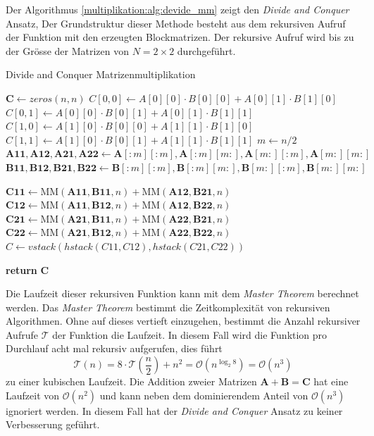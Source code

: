 Der Algorithmus \ref{multiplikation:alg:devide_mm} zeigt den \textit{Divide and Conquer} Ansatz,
Der Grundstruktur dieser Methode besteht aus dem rekursiven Aufruf der Funktion mit den erzeugten Blockmatrizen.
Der rekursive Aufruf wird bis zu der Gr\"osse der Matrizen von $N = 2 \times 2$ durchgef\"uhrt.
\begin{algorithm}\footnotesize\caption{Divide and Conquer Matrizenmultiplikation}
	\setlength{\lineskip}{7pt}
	\label{multiplikation:alg:devide_mm}
	\begin{algorithmic}
		\State  $ \mathbf{C} \gets zeros(n, n)$
		\State  $C[0, 0] \gets  A[0][0]\cdot B[0][0]+A[0][1]\cdot B[1][0]$
		\State  $C[0, 1] \gets  A[0][0]\cdot B[0][1]+A[0][1]\cdot B[1][1]$
		\State  $C[1, 0] \gets  A[1][0]\cdot B[0][0]+A[1][1]\cdot B[1][0]$
		\State  $C[1, 1] \gets  A[1][0]\cdot B[0][1]+A[1][1]\cdot B[1][1]$
		\Else
		\State  $ m \gets n/2$
		\State $\mathbf{A11}, \mathbf{A12}, \mathbf{A21}, \mathbf{A22} \gets \mathbf{A}[:m][:m], \mathbf{A}[:m][m:], \mathbf{A}[m:][:m], \mathbf{A}[m:][m:]$
		\State $\mathbf{B11}, \mathbf{B12}, \mathbf{B21}, \mathbf{B22} \gets \mathbf{B}[:m][:m], \mathbf{B}[:m][m:], \mathbf{B}[m:][:m], \mathbf{B}[m:][m:]$

		\State $\mathbf{C11} \gets \text{MM}(\mathbf{A11}, \mathbf{B11},n) + \text{MM}(\mathbf{A12}, \mathbf{B21},n)$
		\State $\mathbf{C12} \gets \text{MM}(\mathbf{A11},\mathbf{B12},n) + \text{MM}(\mathbf{A12}, \mathbf{B22},n)$
		\State $\mathbf{C21} \gets \text{MM}(\mathbf{A21}, \mathbf{B11},n) + \text{MM}(\mathbf{A22}, \mathbf{B21},n)$
		\State $\mathbf{C22} \gets \text{MM}(\mathbf{A21}, \mathbf{B12},n) + \text{MM}(\mathbf{A22}, \mathbf{B22},n)$
		\State $  C \gets vstack(hstack(C11, C12), hstack(C21, C22))$

		\EndIf
		\State \textbf{return} $\textbf{C}$

		\EndFunction
	\end{algorithmic}
\end{algorithm}

Die Laufzeit dieser rekursiven Funktion kann mit dem \textit{Master Theorem} \cite{multiplikation:master_theorem} berechnet werden. Das \textit{Master Theorem} bestimmt die Zeitkomplexit\"at von rekursiven Algorithmen.
Ohne auf dieses vertieft einzugehen, bestimmt die Anzahl rekursiver Aufrufe $\mathcal{T} $ der Funktion die Laufzeit.
In diesem Fall wird die Funktion pro Durchlauf acht mal rekursiv aufgerufen, dies f\"uhrt
\begin{equation} \label{multiplikation:eq:laufzeitdac}
	\mathcal{T}(n) =	8 \cdot \mathcal{T} \left(\frac{n}{2}\right ) + n^2  = \mathcal{O}(n^{\log_2 8}) = \mathcal{O}  (n^{3} )
\end{equation}
zu einer kubischen Laufzeit.
Die Addition zweier Matrizen $\mathbf{A} + \mathbf{B} = \mathbf{C}$ hat eine Laufzeit von $\mathcal{O}(n^{2})$ und kann neben dem dominierendem Anteil von $\mathcal{O}(n^{3})$ ignoriert werden.
In diesem Fall hat der \textit{Divide and Conquer} Ansatz zu keiner Verbesserung gef\"uhrt.


